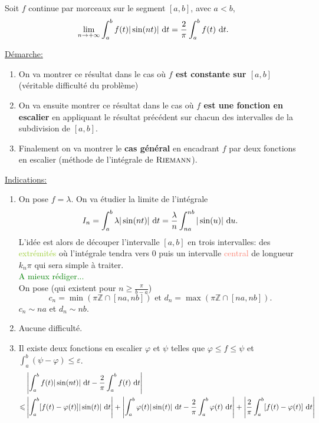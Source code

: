 \begin{tcolorbox}
    Soit $f$ continue par morceaux sur le segment $[a,b]$, avec $a < b$,
    $$\lim_{n \to +\infty} \int_{a}^{b} f(t) | \sin (nt) |\ \mathrm{d} t = \frac{2}{\pi} \int_{a}^{b} f(t)\ \mathrm{d} t.$$
\end{tcolorbox}
    
\underline{Démarche:}
\begin{enumerate}[noitemsep]
    \item On va montrer ce résultat dans le cas où \textbf{$f$ est constante sur $[a, b]$} (véritable difficulté du problème) 
    \item On va ensuite montrer ce résultat dans le cas où \textbf{$f$ est une fonction en escalier} en appliquant le résultat précédent sur chacun des intervalles de la subdivision de $[a, b]$.
    \item Finalement on va montrer le \textbf{cas général} en encadrant $f$ par deux fonctions en escalier (méthode de l'intégrale de $\textsc{Riemann}$).
\end{enumerate}
\underline{Indications:}
\begin{enumerate}[noitemsep]
    \item On pose $f = \lambda$. On va étudier la limite de l'intégrale
    $$I_n = \int_{a}^{b} \lambda | \sin(nt) |\ \mathrm{d} t = \frac{\lambda}{n} \int_{na}^{nb} | \sin(u) |\ \mathrm{d} u.$$
    L'idée est alors de découper l'intervalle $[a, b]$ en trois intervalles: des \textcolor{YellowGreen}{extrémités} où l'intégrale tendra vers $0$ puis un intervalle \textcolor{Salmon}{central} de longueur $k_n \pi$ qui sera simple à traiter. \\
    \textcolor{green}{A mieux rédiger...} \\
    On pose (qui existent pour $n \geqslant \frac{\pi}{b-a}$)
    $$c_n = \min( \pi \mathbb{Z} \cap [na, nb]) \text{ et } d_n = \max( \pi \mathbb{Z} \cap [na, nb]).$$
    $c_n \sim na$ et $d_n \sim nb$. 
    \item Aucune difficulté.
    \item Il existe deux fonctions en escalier $\varphi$ et $\psi$ telles que $\varphi \leqslant f \leqslant \psi$ et $\int_{a}^{b} (\psi - \varphi) \leqslant \varepsilon$.
    \begin{align*}
        & \left | \int_{a}^{b} f(t) | \sin (nt) |\ \mathrm{d} t - \frac{2}{\pi} \int_{a}^{b} f(t)\ \mathrm{d} t \right| \\
        \leqslant & \left | \int_{a}^{b} [f(t) - \varphi(t) ] | \sin(t) |\ \mathrm{d} t \right| + \left | \int_{a}^{b} \varphi(t) |\sin(t)|\ \mathrm{d} t - \frac{2}{\pi} \int_{a}^{b} \varphi(t)\ \mathrm{d} t \right| + \left| \frac{2}{\pi} \int_{a}^{b} [f(t) - \varphi(t)]\ \mathrm{d} t \right|
    \end{align*}
\end{enumerate}
